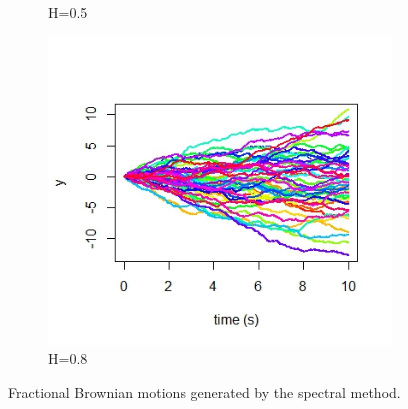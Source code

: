 \documentclass{article}
\begin{document}
\begin{figure}[h]
\begin{subfigure}{0.32\textwidth}
        \caption{H=0.5}
    \end{subfigure}\hfill
    \begin{subfigure}{0.32\textwidth}
        \centering
        \includegraphics[width=\textwidth]{specsim3.jpeg}
        \caption{H=0.8}
    \end{subfigure}
    \caption{Fractional Brownian motions generated by the spectral method.}
    \label{fig:fbmsim}
\end{figure}
\end{document}
